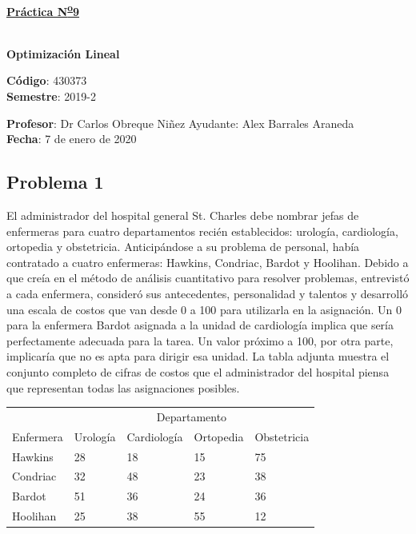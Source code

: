 \documentclass[letterpaper]{article}
\begin{document}
\vspace*{0.5\baselineskip}
\begin{center}
\begin{Large}
\textbf{\underline{Práctica N\textsuperscript{\underline{o}}9}}
\end{Large}\\
\vspace*{0.5\baselineskip}
\textbf{Optimización Lineal} \\
\vspace*{0.5\baselineskip}
\begin{footnotesize}
\textbf{Código}: 430373\\
\textbf{Semestre}: 2019-2
\end{footnotesize}
\end{center}

\noindent \textbf{Profesor}: Dr Carlos Obreque Niñez  \hfill Ayudante: Alex Barrales Araneda\\
\noindent \textbf{Fecha}: 7 de enero de 2020

\subsection*{Problema 1}
El administrador del hospital general St. Charles debe nombrar jefas de enfermeras para cuatro departamentos recién establecidos: urología, cardiología, ortopedia y obstetricia. Anticipándose a su problema de personal, había contratado a cuatro enfermeras: Hawkins, Condriac, Bardot y Hoolihan. Debido a que creía en el método de análisis cuantitativo para resolver problemas, entrevistó a cada enfermera, consideró sus antecedentes, personalidad y talentos y desarrolló una escala de costos que van desde 0 a 100 para utilizarla en la asignación. Un 0 para la enfermera Bardot asignada a la unidad de cardiología implica que sería perfectamente adecuada para la tarea. Un valor próximo a 100, por otra parte, implicaría que no es apta para dirigir esa unidad. La tabla adjunta muestra el conjunto completo de cifras de costos que el administrador del hospital piensa que representan todas las asignaciones posibles. 


\begin{table}[H]
\begin{center}
\begin{tabular}{lllll}
\hline
          & \multicolumn{4}{c}{Departamento}                 \\
Enfermera & Urología & Cardiología & Ortopedia & Obstetricia \\ \hline
Hawkins   & 28       & 18          & 15        & 75          \\
Condriac  & 32       & 48          & 23        & 38          \\
Bardot    & 51       & 36          & 24        & 36          \\
Hoolihan  & 25       & 38          & 55        & 12         \\
\hline
\end{tabular}
\end{center}
\end{table}
\end{document}
